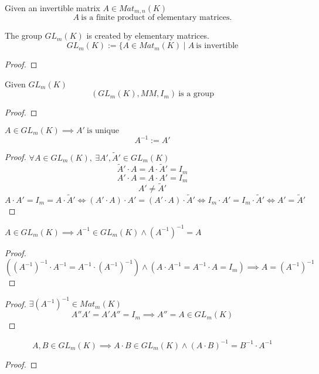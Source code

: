 \begin{theorem}[Invertible Matrix = Product of Elementary Matrices]
   Given an invertible matrix \(A \in Mat_{m,n}(K)\)
   \[A~\text{is a finite product of elementary matrices.}\]
\end{theorem}
\begin{remark}
   The group \(GL_m(K)\) is created by elementary matrices.
   \[GL_m(K) := \{A \in Mat_m(K) \mid A~\text{is invertible}\]
\end{remark}
\begin{proof}
\end{proof}

\begin{proposition}\label{pro:general_linear_group}
   Given \(GL_m(K)\)
   \[(GL_m(K), MM, I_m)~\text{is a group}\]
\end{proposition}
\begin{proof}
\end{proof}

\begin{corollary}[Uniqueness of \(A'\)]
\(A \in GL_m(K) \implies A'~\text{is unique}\)
\[A^{-1} := A'\]
\end{corollary}
\begin{proof}
   \(\forall A \in GL_m(K),~\exists A', \tilde{A}' \in GL_m(K)\)
   \[\tilde{A}' \cdot A = A \cdot \tilde{A}' = I_m\]
   \[A' \cdot A = A \cdot A' = I_m\]
   \[A' \neq \tilde{A}'\]
   \[A \cdot A' = I_m = A \cdot \tilde{A}' \iff (A' \cdot A) \cdot A' = (A' \cdot A) \cdot \tilde{A}' \iff I_m \cdot A' = I_m \cdot \tilde{A}' \iff A' = \tilde{A}'\]
\end{proof}

\begin{corollary}[\((A^{-1})^{-1} = A\)]
   \(A \in GL_m(K) \implies A^{-1} \in GL_m(K) \land (A^{-1})^{-1} = A\)
\end{corollary}
\begin{proof}
   \[((A^{-1})^{-1} \cdot A^{-1} = A^{-1} \cdot (A^{-1})^{-1}) \land (A \cdot A^{-1} = A^{-1} \cdot A = I_m) \implies A = (A^{-1})^{-1}\]
\end{proof}
\begin{proof}
   \(\exists (A^{-1})^{-1} \in Mat_m(K)\)
   \[A'' A' = A' A'' = I_m \implies A'' = A \in GL_m(K)\]
\end{proof}

\begin{corollary}[\((A \cdot B)^{-1} = B^{-1} \cdot A^{-1}\)]
   \[A, B \in GL_m(K) \implies A \cdot B \in GL_m(K) \land (A \cdot B)^{-1} = B^{-1} \cdot A^{-1}\]
\end{corollary}
\begin{proof}
\end{proof}

